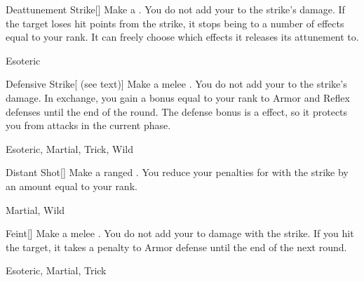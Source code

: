 \lowercase{\hypertarget{maneuver:Deattunement Strike}{}}\label{maneuver:Deattunement Strike}
\hypertarget{maneuver:Deattunement Strike}{}
\begin{freeability}[Rank 2]{Deattunement Strike}[]
Make a .
You do not add your  to the strike's damage.
If the target loses hit points from the strike, it stops being  to a number of effects equal to your rank.
It can freely choose which effects it releases its attunement to.


 Esoteric
\end{freeability}
\vspace{0.25em}



\lowercase{\hypertarget{maneuver:Defensive Strike}{}}\label{maneuver:Defensive Strike}
\hypertarget{maneuver:Defensive Strike}{}
\begin{freeability}[Rank 2]{Defensive Strike}[ (see text)]
Make a melee .
You do not add your  to the strike's damage.
In exchange, you gain a bonus equal to your rank to Armor and Reflex defenses until the end of the round.
The defense bonus is a  effect, so it protects you from attacks in the current phase.


 Esoteric, Martial, Trick, Wild
\end{freeability}
\vspace{0.25em}



\lowercase{\hypertarget{maneuver:Distant Shot}{}}\label{maneuver:Distant Shot}
\hypertarget{maneuver:Distant Shot}{}
\begin{freeability}[Rank 2]{Distant Shot}[]
Make a ranged .
You reduce your penalties for  with the strike by an amount equal to your rank.


 Martial, Wild
\end{freeability}
\vspace{0.25em}



\lowercase{\hypertarget{maneuver:Feint}{}}\label{maneuver:Feint}
\hypertarget{maneuver:Feint}{}
\begin{freeability}[Rank 2]{Feint}[]
Make a melee .
You do not add your  to damage with the strike.
If you hit the target, it takes a  penalty to Armor defense until the end of the next round.


 Esoteric, Martial, Trick
\end{freeability}
\vspace{0.25em}



